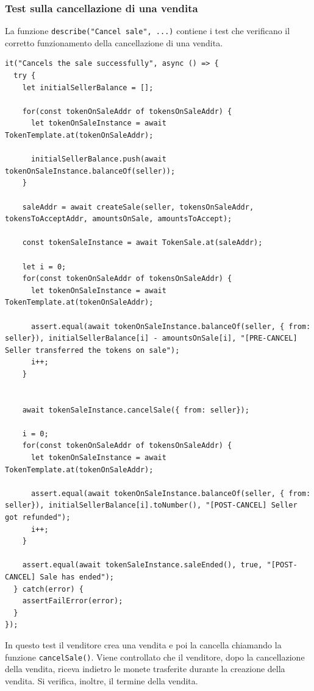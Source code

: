 \documentclass[a4paper]{article}
\begin{document}
        \subsubsection{Test sulla cancellazione di una vendita}
        La funzione \verb|describe("Cancel sale", ...)| contiene i test che verificano il corretto funzionamento della cancellazione di una vendita.
\begin{lstlisting}[style=ES6, title={La vendita viene correttamente cancellata}]
it("Cancels the sale successfully", async () => {
  try {
    let initialSellerBalance = [];

    for(const tokenOnSaleAddr of tokensOnSaleAddr) {
      let tokenOnSaleInstance = await TokenTemplate.at(tokenOnSaleAddr);
      
      initialSellerBalance.push(await tokenOnSaleInstance.balanceOf(seller));
    }

    saleAddr = await createSale(seller, tokensOnSaleAddr, tokensToAcceptAddr, amountsOnSale, amountsToAccept);

    const tokenSaleInstance = await TokenSale.at(saleAddr);

    let i = 0;
    for(const tokenOnSaleAddr of tokensOnSaleAddr) {
      let tokenOnSaleInstance = await TokenTemplate.at(tokenOnSaleAddr);

      assert.equal(await tokenOnSaleInstance.balanceOf(seller, { from: seller}), initialSellerBalance[i] - amountsOnSale[i], "[PRE-CANCEL] Seller transferred the tokens on sale");
      i++;
    }
    

    await tokenSaleInstance.cancelSale({ from: seller});

    i = 0;
    for(const tokenOnSaleAddr of tokensOnSaleAddr) {
      let tokenOnSaleInstance = await TokenTemplate.at(tokenOnSaleAddr);
      
      assert.equal(await tokenOnSaleInstance.balanceOf(seller, { from: seller}), initialSellerBalance[i].toNumber(), "[POST-CANCEL] Seller got refunded");
      i++;
    }

    assert.equal(await tokenSaleInstance.saleEnded(), true, "[POST-CANCEL] Sale has ended");
  } catch(error) {
    assertFailError(error);
  }
});
\end{lstlisting}
        In questo test il venditore crea una vendita e poi la cancella chiamando la funzione \verb|cancelSale()|. Viene controllato che il venditore, dopo la cancellazione della vendita, riceva indietro le monete trasferite durante la creazione della vendita. Si verifica, inoltre, il termine della vendita.
\end{document}

